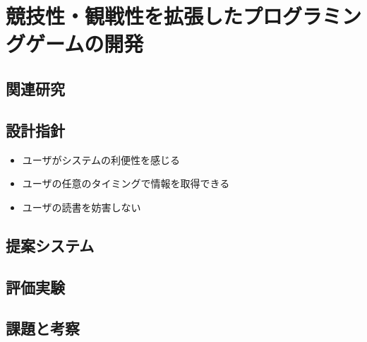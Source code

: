 \section{競技性・観戦性を拡張したプログラミングゲームの開発}


\subsection{関連研究}

\subsection{設計指針}

\begin{itemize}
	\item ユーザがシステムの利便性を感じる
	\item ユーザの任意のタイミングで情報を取得できる
	\item ユーザの読書を妨害しない
\end{itemize}


\subsection{提案システム}

\subsection{評価実験}

\subsection{課題と考察}




